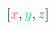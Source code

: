 \documentclass[preview]{standalone}
\begin{document}
$\left[\textcolor[HTML]{fe5e56}{x}, \textcolor[HTML]{00ef75}{y}, \textcolor[HTML]{0069fe}{z}\right]$
\end{document}

